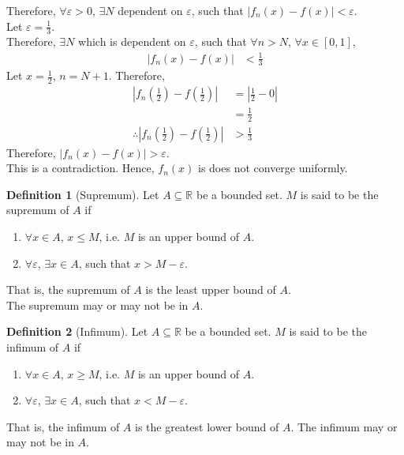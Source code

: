 \documentclass[fleqn, a4paper, 8pt, twoside]{amsart}
\theoremstyle{definition}
\theoremstyle{bluedefinition}
\newtheorem{definition}{Definition}
\theoremstyle{redtheorem}
\begin{document}
\begin{multicols}{2}
\begin{spacing}{0.7}
\begin{solution}
	Therefore, $\forall \varepsilon > 0$, $\exists N$ dependent on $\varepsilon$, such that $|f_n(x) - f(x)| < \varepsilon$.\\
	Let $\varepsilon = \frac{1}{3}$.\\
	Therefore, $\exists N$ which is dependent on $\varepsilon$, such that $\forall n > N$, $\forall x \in [0,1]$,
	\begin{align*}
		|f_n(x) - f(x)| &< \frac{1}{3}
	\end{align*}
	Let $x = \frac{1}{2}$, $n = N + 1$.
	Therefore,
	\begin{align*}
		\left| f_n \left( \frac{1}{2} \right) - f \left( \frac{1}{2} \right) \right| &= \left| \frac{1}{2} - 0 \right|\\
		&= \frac{1}{2}\\
		\therefore \left| f_n \left( \frac{1}{2} \right) - f \left( \frac{1}{2} \right) \right| &> \frac{1}{3}
	\end{align*}
	Therefore, $|f_n(x) - f(x)| > \varepsilon$.\\
	This is a contradiction.
	Hence, $f_n(x)$ is does not converge uniformly.
\end{solution}

\begin{definition}[Supremum]
	Let $A \subseteq \mathbb{R}$ be a bounded set.
	$M$ is said to be the supremum of $A$ if
	\begin{enumerate}
		\item $\forall x \in A$, $x \le M$, i.e. $M$ is an upper bound of $A$.
		\item $\forall \varepsilon$, $\exists x \in A$, such that $x > M - \varepsilon$.
	\end{enumerate}
	That is, the supremum of $A$ is the least upper bound of $A$.\\
	The supremum may or may not be in $A$.
\end{definition}

\begin{definition}[Infimum]
	Let $A \subseteq \mathbb{R}$ be a bounded set.
	$M$ is said to be the infimum of $A$ if
	\begin{enumerate}
		\item $\forall x \in A$, $x \ge M$, i.e. $M$ is an upper bound of $A$.
		\item $\forall \varepsilon$, $\exists x \in A$, such that $x < M - \varepsilon$.
	\end{enumerate}
	That is, the infimum of $A$ is the greatest lower bound of $A$.
	The infimum may or may not be in $A$.
\end{definition}


\end{spacing}
\end{multicols}
\end{document}
